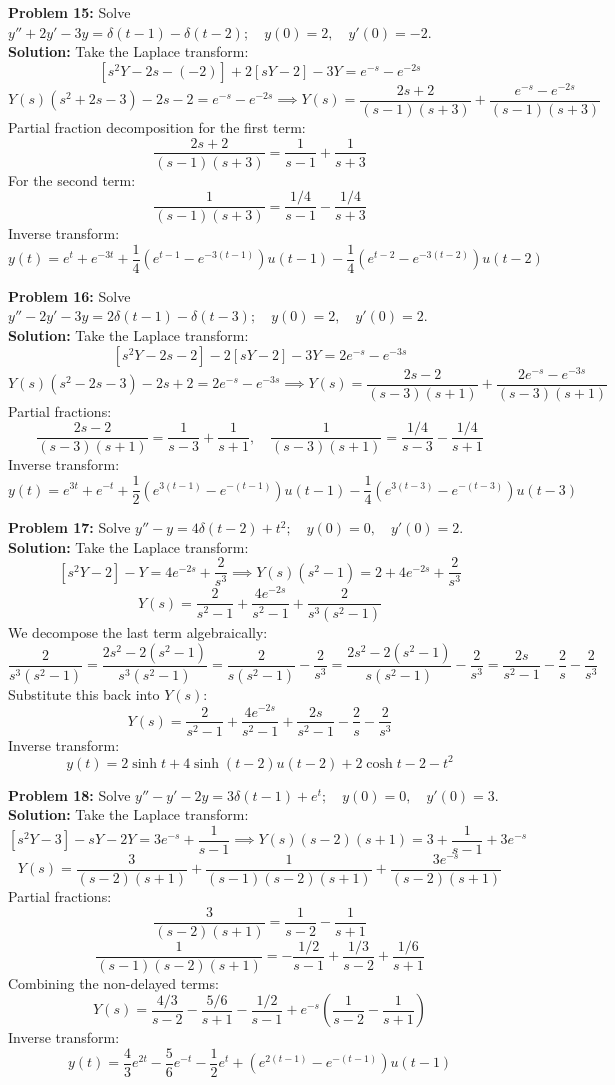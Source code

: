 \documentclass[11pt, letterpaper]{article}
\theoremstyle{definition}
\theoremstyle{remark}
\begin{document}
\textbf{Problem 15:} Solve $y'' + 2y' - 3y = \delta(t - 1) - \delta(t - 2); \quad y(0) = 2, \quad y'(0) = -2$.
\\[4pt]
\textbf{Solution:} Take the Laplace transform:
\[ [s^2 Y - 2s - (-2)] + 2[sY - 2] - 3Y = e^{-s} - e^{-2s} \]
\[ Y(s)(s^2 + 2s - 3) - 2s - 2 = e^{-s} - e^{-2s} \implies Y(s) = \frac{2s + 2}{(s-1)(s+3)} + \frac{e^{-s} - e^{-2s}}{(s-1)(s+3)} \]
Partial fraction decomposition for the first term:
\[ \frac{2s + 2}{(s-1)(s+3)} = \frac{1}{s-1} + \frac{1}{s+3} \]
For the second term:
\[ \frac{1}{(s-1)(s+3)} = \frac{1/4}{s-1} - \frac{1/4}{s+3} \]
Inverse transform:
\[ y(t) = e^t + e^{-3t} + \frac{1}{4}\left(e^{t-1} - e^{-3(t-1)}\right)u(t-1) - \frac{1}{4}\left(e^{t-2} - e^{-3(t-2)}\right)u(t-2) \]

\textbf{Problem 16:} Solve $y'' - 2y' - 3y = 2\delta(t - 1) - \delta(t - 3); \quad y(0) = 2, \quad y'(0) = 2$.
\\[4pt]
\textbf{Solution:} Take the Laplace transform:
\[ [s^2 Y - 2s - 2] - 2[sY - 2] - 3Y = 2e^{-s} - e^{-3s} \]
\[ Y(s)(s^2 - 2s - 3) - 2s + 2 = 2e^{-s} - e^{-3s} \implies Y(s) = \frac{2s - 2}{(s-3)(s+1)} + \frac{2e^{-s} - e^{-3s}}{(s-3)(s+1)} \]
Partial fractions:
\[ \frac{2s - 2}{(s-3)(s+1)} = \frac{1}{s-3} + \frac{1}{s+1}, \quad \frac{1}{(s-3)(s+1)} = \frac{1/4}{s-3} - \frac{1/4}{s+1} \]
Inverse transform:
\[ y(t) = e^{3t} + e^{-t} + \frac{1}{2}\left(e^{3(t-1)} - e^{-(t-1)}\right)u(t-1) - \frac{1}{4}\left(e^{3(t-3)} - e^{-(t-3)}\right)u(t-3) \]

\textbf{Problem 17:} Solve $y'' - y = 4\delta(t - 2) + t^2; \quad y(0) = 0, \quad y'(0) = 2$.
\\[4pt]
\textbf{Solution:} Take the Laplace transform:
\[ [s^2 Y - 2] - Y = 4e^{-2s} + \frac{2}{s^3} \implies Y(s)(s^2 - 1) = 2 + 4e^{-2s} + \frac{2}{s^3} \]
\[ Y(s) = \frac{2}{s^2 - 1} + \frac{4e^{-2s}}{s^2 - 1} + \frac{2}{s^3(s^2 - 1)} \]
We decompose the last term algebraically:
\[ \frac{2}{s^3(s^2 - 1)} = \frac{2s^2 - 2(s^2 - 1)}{s^3(s^2 - 1)} = \frac{2}{s(s^2 - 1)} - \frac{2}{s^3} = \frac{2s^2 - 2(s^2 - 1)}{s(s^2 - 1)} - \frac{2}{s^3} = \frac{2s}{s^2 - 1} - \frac{2}{s} - \frac{2}{s^3} \]
Substitute this back into $Y(s)$:
\[ Y(s) = \frac{2}{s^2 - 1} + \frac{4e^{-2s}}{s^2 - 1} + \frac{2s}{s^2 - 1} - \frac{2}{s} - \frac{2}{s^3} \]
Inverse transform:
\[ y(t) = 2\sinh t + 4\sinh(t-2)u(t-2) + 2\cosh t - 2 - t^2 \]

\textbf{Problem 18:} Solve $y'' - y' - 2y = 3\delta(t - 1) + e^t; \quad y(0) = 0, \quad y'(0) = 3$.
\\[4pt]
\textbf{Solution:} Take the Laplace transform:
\[ [s^2 Y - 3] - sY - 2Y = 3e^{-s} + \frac{1}{s-1} \implies Y(s)(s-2)(s+1) = 3 + \frac{1}{s-1} + 3e^{-s} \]
\[ Y(s) = \frac{3}{(s-2)(s+1)} + \frac{1}{(s-1)(s-2)(s+1)} + \frac{3e^{-s}}{(s-2)(s+1)} \]
Partial fractions:
\[ \frac{3}{(s-2)(s+1)} = \frac{1}{s-2} - \frac{1}{s+1} \]
\[ \frac{1}{(s-1)(s-2)(s+1)} = -\frac{1/2}{s-1} + \frac{1/3}{s-2} + \frac{1/6}{s+1} \]
Combining the non-delayed terms:
\[ Y(s) = \frac{4/3}{s-2} - \frac{5/6}{s+1} - \frac{1/2}{s-1} + e^{-s}\left(\frac{1}{s-2} - \frac{1}{s+1}\right) \]
Inverse transform:
\[ y(t) = \frac{4}{3}e^{2t} - \frac{5}{6}e^{-t} - \frac{1}{2}e^t + \left(e^{2(t-1)} - e^{-(t-1)}\right)u(t-1) \]
\end{document}
